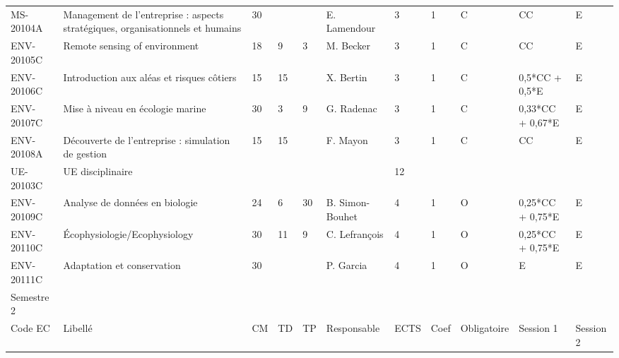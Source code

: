 \documentclass[a4paper,11pt]{article}
\begin{document}
{{\begin{tabular}{lllllllllll}
MS-20104A     & Management de l'entreprise : aspects stratégiques, organisationnels et humains & 30 &    &    & E. Lamendour    & 3    & 1    & C           & CC               & E                \\
ENV-20105C    & Remote sensing of environment                                                  & 18 & 9  & 3  & M. Becker       & 3    & 1    & C           & CC               & E                \\
ENV-20106C    & Introduction aux aléas et risques côtiers                                      & 15 & 15 &    & X. Bertin       & 3    & 1    & C           & 0,5*CC + 0,5*E   & E                \\
ENV-20107C    & Mise à niveau en écologie marine                                               & 30 & 3  & 9  & G. Radenac      & 3    & 1    & C           & 0,33*CC + 0,67*E & E                \\
ENV-20108A    & Découverte de l'entreprise : simulation de gestion                             & 15 & 15 &    & F. Mayon        & 3    & 1    & C           & CC               & E                \\
\rowcolor[HTML]{C0C0C0} 
UE-20103C     & UE disciplinaire                                                               &    &    &    &                 & 12   &      &             &                  &                  \\
ENV-20109C    & Analyse de données en biologie                                                 & 24 & 6  & 30 & B. Simon-Bouhet & 4    & 1    & O           & 0,25*CC + 0,75*E & E                \\
ENV-20110C    & Écophysiologie/Ecophysiology                                                   & 30 & 11 & 9  & C. Lefrançois   & 4    & 1    & O           & 0,25*CC + 0,75*E & E                \\
ENV-20111C    & Adaptation et conservation                                                     & 30 &    &    & P. Garcia       & 4    & 1    & O           & E                & E                \\
\rowcolor[HTML]{656565} 
Semestre 2    &                                                                                &    &    &    &                 &      &      &             &                  &                  \\
\rowcolor[HTML]{9B9B9B} 
Code EC       & Libellé                                                                        & CM & TD & TP & Responsable     & ECTS & Coef & Obligatoire & Session 1        & Session 2        \\

\end{tabular}}}
\end{document}
